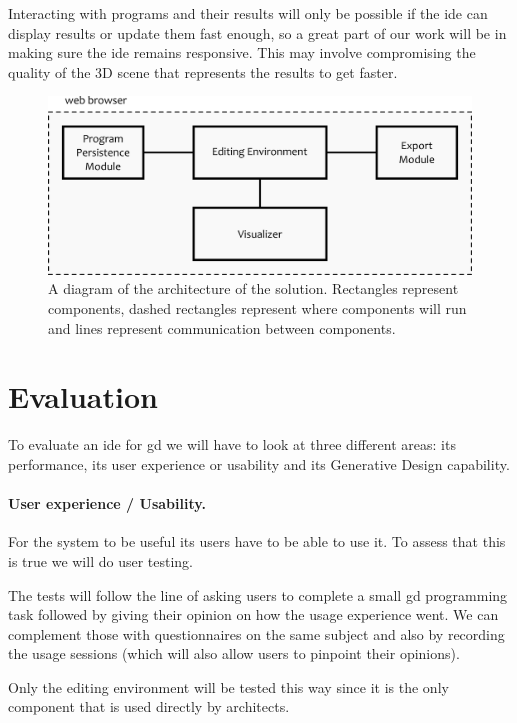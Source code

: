 \documentclass{./llncs2e/llncs}
\begin{document}
	Interacting with programs and their results will only be possible if the \ac{ide} can display results or update them fast enough, so a great part of our work will be in making sure the \ac{ide} remains responsive.
	This may involve compromising the quality of the 3D scene that represents the results to get faster.
	
	\begin{figure}
		\centering
		\includegraphics[width=1.0\textwidth]{img/gen_sol}
		\caption{A diagram of the architecture of the solution. Rectangles represent components, dashed rectangles represent where components will run and lines represent communication between components.}
		\label{fig:gen:sol}
	\end{figure}	
	

\section{Evaluation}
	To evaluate an \ac{ide} for \ac{gd} we will have to look at three different areas:
	its performance, its user experience or usability and its Generative Design capability.
	
	\paragraph{User experience / Usability.}
	For the system to be useful its users have to be able to use it.
	To assess that this is true we will do user testing.
	
	The tests will follow the line of asking users to complete a small \ac{gd} programming task followed by giving their opinion on how the usage experience went.
	We can complement those with questionnaires on the same subject and also by recording the usage sessions (which will also allow users to pinpoint their opinions).
	
	Only the editing environment will be tested this way since it is the only component that is used directly by architects.
	
\end{document}

